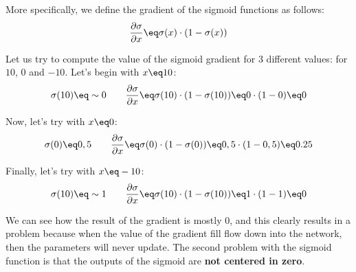 \begin{center}
\end{center}

More specifically, we define the gradient of the sigmoid functions as follows:
\[ \frac{\partial \sigma}{\partial x} \eq \sigma(x) \cdot (1 - \sigma(x)) \]

Let us try to compute the value of the sigmoid gradient for 3 different values: for $10$, $0$ and $-10$. Let's begin with $x \eq 10$:
\[ \sigma(10) \eq \sim 0 \quad \quad \frac{\partial \sigma}{\partial x} \eq \sigma(10) \cdot (1 - \sigma(10)) \eq 0 \cdot (1 - 0) \eq 0 \]

Now, let's try with $x \eq 0$:
\[ \sigma(0) \eq 0,5 \quad \quad \frac{\partial \sigma}{\partial x} \eq \sigma(0) \cdot (1 - \sigma(0)) \eq 0,5 \cdot (1 - 0,5) \eq 0.25 \]

Finally, let's try with $x \eq -10$:
\[ \sigma(10) \eq \sim 1 \quad \quad \frac{\partial \sigma}{\partial x} \eq \sigma(10) \cdot (1 - \sigma(10)) \eq 1 \cdot (1 - 1) \eq 0 \]

We can see how the result of the gradient is mostly 0, and this clearly results in a problem because when the value of the gradient fill flow down into the network, then the parameters will never update.
\nwl
The second problem with the sigmoid function is that the outputs of the sigmoid are \textbf{not centered in zero}.

